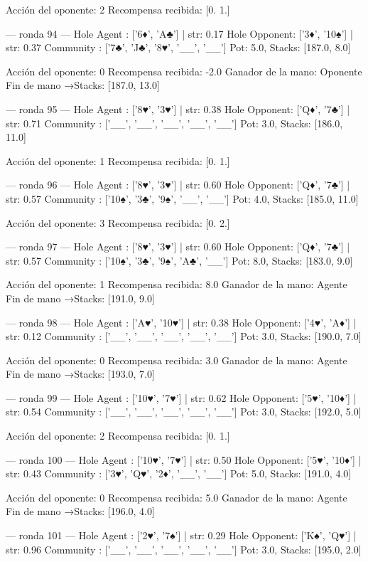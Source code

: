 Acción del oponente: 2
Recompensa recibida: [0. 1.]

--- ronda 94 ---
Hole Agent : ['6♦', 'A♣'] | str: 0.17
Hole Opponent: ['3♦', '10♠'] | str: 0.37
Community  : ['7♣', 'J♣', '8♥', '__', '__']
Pot: 5.0, Stacks: [187.0, 8.0]

Acción del oponente: 0
Recompensa recibida: -2.0
Ganador de la mano: Oponente
Fin de mano →Stacks: [187.0, 13.0]


--- ronda 95 ---
Hole Agent : ['8♥', '3♥'] | str: 0.38
Hole Opponent: ['Q♦', '7♣'] | str: 0.71
Community  : ['__', '__', '__', '__', '__']
Pot: 3.0, Stacks: [186.0, 11.0]

Acción del oponente: 1
Recompensa recibida: [0. 1.]

--- ronda 96 ---
Hole Agent : ['8♥', '3♥'] | str: 0.60
Hole Opponent: ['Q♦', '7♣'] | str: 0.57
Community  : ['10♠', '3♣', '9♠', '__', '__']
Pot: 4.0, Stacks: [185.0, 11.0]

Acción del oponente: 3
Recompensa recibida: [0. 2.]

--- ronda 97 ---
Hole Agent : ['8♥', '3♥'] | str: 0.60
Hole Opponent: ['Q♦', '7♣'] | str: 0.57
Community  : ['10♠', '3♣', '9♠', 'A♣', '__']
Pot: 8.0, Stacks: [183.0, 9.0]

Acción del oponente: 1
Recompensa recibida: 8.0
Ganador de la mano: Agente
Fin de mano →Stacks: [191.0, 9.0]


--- ronda 98 ---
Hole Agent : ['A♥', '10♥'] | str: 0.38
Hole Opponent: ['4♥', 'A♦'] | str: 0.12
Community  : ['__', '__', '__', '__', '__']
Pot: 3.0, Stacks: [190.0, 7.0]

Acción del oponente: 0
Recompensa recibida: 3.0
Ganador de la mano: Agente
Fin de mano →Stacks: [193.0, 7.0]


--- ronda 99 ---
Hole Agent : ['10♥', '7♥'] | str: 0.62
Hole Opponent: ['5♥', '10♦'] | str: 0.54
Community  : ['__', '__', '__', '__', '__']
Pot: 3.0, Stacks: [192.0, 5.0]

Acción del oponente: 2
Recompensa recibida: [0. 1.]

--- ronda 100 ---
Hole Agent : ['10♥', '7♥'] | str: 0.50
Hole Opponent: ['5♥', '10♦'] | str: 0.43
Community  : ['3♥', 'Q♥', '2♦', '__', '__']
Pot: 5.0, Stacks: [191.0, 4.0]

Acción del oponente: 0
Recompensa recibida: 5.0
Ganador de la mano: Agente
Fin de mano →Stacks: [196.0, 4.0]


--- ronda 101 ---
Hole Agent : ['2♥', '7♠'] | str: 0.29
Hole Opponent: ['K♠', 'Q♥'] | str: 0.96
Community  : ['__', '__', '__', '__', '__']
Pot: 3.0, Stacks: [195.0, 2.0]

